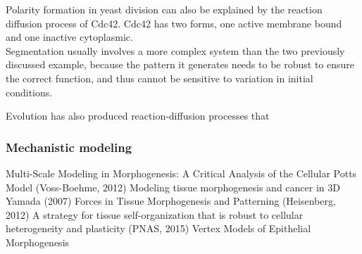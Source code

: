 \documentclass[fleqn,10pt]{wlscirep}
\begin{document}
\begin{itemize}
Polarity formation in yeast division can also be explained by the reaction diffusion process of Cdc42. Cdc42 has two forms, one active membrane bound and one inactive cytoplasmic.  \cite{goryachev2008dynamics} \\

Segmentation usually involves a more complex system than the two previously discussed example, because the pattern it generates needs to be robust to ensure the correct function, and thus cannot be sensitive to variation in initial conditions. 

Evolution has also produced reaction-diffusion processes that 
\end{itemize}



\subsubsection*{Mechanistic modeling}
Multi-Scale Modeling in Morphogenesis: A Critical Analysis of the Cellular Potts Model (Voss-Boehme, 2012)
Modeling tissue morphogenesis and cancer in 3D Yamada (2007)
Forces in Tissue Morphogenesis and Patterning (Heisenberg, 2012)
A strategy for tissue self-organization that is robust to
cellular heterogeneity and plasticity (PNAS, 2015)
Vertex Models of Epithelial Morphogenesis
\end{document}
